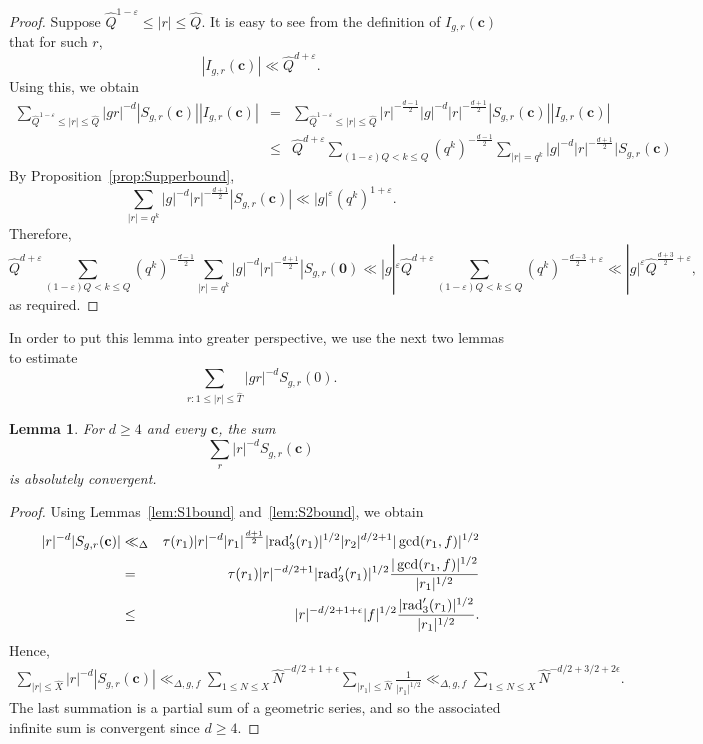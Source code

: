\documentclass[11pt]{amsart}
\theoremstyle{plain}
\theoremstyle{plain}
\newtheorem{lemma}[theorem]{Lemma}
\renewcommand{\vec}[1]{\mathbf{#1}}
\theoremstyle{remark}
\theoremstyle{definition}
\newcommand{\rad}{\textup{rad}'_3}
\renewcommand{\hat}{\widehat}
\newcommand{\hQ}{\widehat{Q}}
\begin{document}
\begin{proof}
Suppose $\hQ^{1-\varepsilon}\leq |r|\leq\hQ$. It is easy to see from the definition of $I_{g,r}(\vec{c})$ that for such $r$,
\[|I_{g,r}(\vec{c})|\ll \hQ^{d+\varepsilon}.\]
Using this, we obtain
\begin{eqnarray*}\sum_{\hQ^{1-\varepsilon}\leq |r|\leq\hQ}|gr|^{-d}|S_{g,r}(\vec{c})||I_{g,r}(\vec{c})|&=& \sum_{\hQ^{1-\varepsilon}\leq |r|\leq\hQ}|r|^{-\frac{d-1}{2}}|g|^{-d}|r|^{-\frac{d+1}{2}}|S_{g,r}(\vec{c})||I_{g,r}(\vec{c})|\\ &\leq& \hQ^{d+\varepsilon}\sum_{(1-\varepsilon)Q<k\leq Q}\left(q^k\right)^{-\frac{d-1}{2}}\sum_{|r|=q^k}|g|^{-d}|r|^{-\frac{d+1}{2}}|S_{g,r}(\vec{c})
\end{eqnarray*}
By Proposition~\ref{prop:Supperbound},
\[\sum_{|r|=q^k}|g|^{-d}|r|^{-\frac{d+1}{2}}|S_{g,r}(\vec{c})|\ll |g|^{\varepsilon}\left(q^k\right)^{1+\varepsilon}.\]
Therefore,
\[\hQ^{d+\varepsilon}\sum_{(1-\varepsilon)Q<k\leq Q}\left(q^k\right)^{-\frac{d-1}{2}}\sum_{|r|=q^k}|g|^{-d}|r|^{-\frac{d+1}{2}}|S_{g,r}(\vec{0})\ll |g|^{\varepsilon}\hQ^{d+\varepsilon}\sum_{(1-\varepsilon)Q<k\leq Q}\left(q^k\right)^{-\frac{d-3}{2}+\varepsilon}\ll |g|^{\varepsilon}\hQ^{\frac{d+3}{2}+\varepsilon},\]
as required.
\end{proof}
In order to put this lemma into greater perspective, we use the next two lemmas to estimate
\[\sum_{r:1\leq |r|\leq \hat{T}}|gr|^{-d}S_{g,r}(0).\]
\begin{lemma}\label{lem:average}For $d\geq 4$ and every $\vec{c}$, the sum
\[\sum_{r}|r|^{-d}S_{g,r}(\vec{c})\]
is absolutely convergent.
\end{lemma}
\begin{proof}
Using Lemmas~\ref{lem:S1bound} and~\ref{lem:S2bound}, we obtain
\begin{eqnarray*}|r|^{-d}|S_{g,r}(\vec{c})|&\ll_{\Delta}&\tau(r_1)|r|^{-d}|r_1|^{\frac{d+1}{2}}|\rad(r_1)|^{1/2}|r_2|^{d/2+1}|\gcd(r_1,f)|^{1/2}\\&=&\tau(r_1)|r|^{-d/2+1}|\rad(r_1)|^{1/2}\frac{|\gcd(r_1,f)|^{1/2}}{|r_1|^{1/2}}\\&\leq& |r|^{-d/2+1+\epsilon}|f|^{1/2}\frac{|\rad(r_1)|^{1/2}}{|r_1|^{1/2}}.\end{eqnarray*}
Hence,
\begin{eqnarray*}
\sum_{|r|\leq \hat{X}}|r|^{-d}|S_{g,r}(\vec{c})|\ll_{\Delta,g,f}\sum_{1\leq N\leq X}\hat{N}^{-d/2+1+\epsilon}\sum_{|r_1|\leq\hat{N}}\frac{1}{|r_1|^{1/2}}\ll_{\Delta,g,f}\sum_{1\leq N\leq X}\hat{N}^{-d/2+3/2+2\epsilon}.
\end{eqnarray*}
The last summation is a partial sum of a geometric series, and so the associated infinite sum is convergent since $d\geq 4$.
\end{proof}
\end{document}
